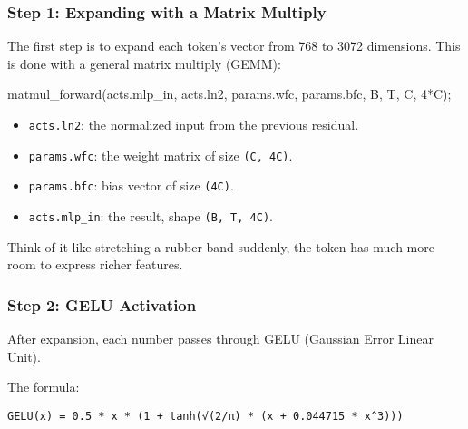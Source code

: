 \documentclass[
  letterpaper,
  DIV=11,
  numbers=noendperiod]{scrreprt}
\newenvironment{Shaded}{\begin{snugshade}}{\end{snugshade}}
\newcommand{\DecValTok}[1]{\textcolor[rgb]{0.68,0.00,0.00}{#1}}
\newcommand{\NormalTok}[1]{\textcolor[rgb]{0.00,0.23,0.31}{#1}}
\newcommand{\OperatorTok}[1]{\textcolor[rgb]{0.37,0.37,0.37}{#1}}
\providecommand{\tightlist}{%
  \setlength{\itemsep}{0pt}\setlength{\parskip}{0pt}}
\begin{document}
\subsubsection{Step 1: Expanding with a Matrix
Multiply}\label{step-1-expanding-with-a-matrix-multiply}

The first step is to expand each token's vector from 768 to 3072
dimensions. This is done with a general matrix multiply (GEMM):

\begin{Shaded}
\begin{Highlighting}[]
\NormalTok{matmul\_forward}\OperatorTok{(}\NormalTok{acts}\OperatorTok{.}\NormalTok{mlp\_in}\OperatorTok{,}\NormalTok{ acts}\OperatorTok{.}\NormalTok{ln2}\OperatorTok{,}\NormalTok{ params}\OperatorTok{.}\NormalTok{wfc}\OperatorTok{,}\NormalTok{ params}\OperatorTok{.}\NormalTok{bfc}\OperatorTok{,}\NormalTok{ B}\OperatorTok{,}\NormalTok{ T}\OperatorTok{,}\NormalTok{ C}\OperatorTok{,} \DecValTok{4}\OperatorTok{*}\NormalTok{C}\OperatorTok{);}
\end{Highlighting}
\end{Shaded}

\begin{itemize}
\tightlist
\item
  \texttt{acts.ln2}: the normalized input from the previous residual.
\item
  \texttt{params.wfc}: the weight matrix of size \texttt{(C,\ 4C)}.
\item
  \texttt{params.bfc}: bias vector of size \texttt{(4C)}.
\item
  \texttt{acts.mlp\_in}: the result, shape \texttt{(B,\ T,\ 4C)}.
\end{itemize}

Think of it like stretching a rubber band-suddenly, the token has much
more room to express richer features.

\subsubsection{Step 2: GELU Activation}\label{step-2-gelu-activation}

After expansion, each number passes through GELU (Gaussian Error Linear
Unit).

The formula:

\begin{verbatim}
GELU(x) = 0.5 * x * (1 + tanh(√(2/π) * (x + 0.044715 * x^3)))
\end{verbatim}
\end{document}
